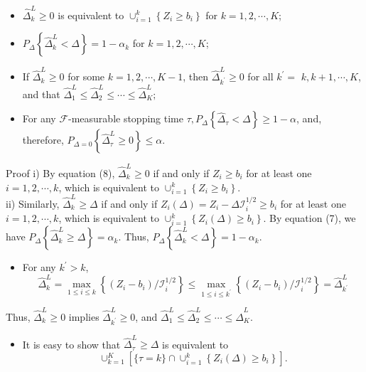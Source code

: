 \documentclass[10pt]{article}
\begin{document}
\begin{itemize}
  \item[i)] $\hat{\Delta}_{k}^{L} \geq 0$ is equivalent to $\cup_{i=1}^{k}\left\{Z_{i} \geq b_{i}\right\}$ for $k=1,2, \cdots, K$;
  \item[ii)] $P_{\Delta}\left\{\hat{\Delta}_{k}^{L}<\Delta\right\}=1-\alpha_{k}$ for $k=1,2, \cdots, K$;
  \item[iii)] If $\hat{\Delta}_{k}^{L} \geq 0$ for some $k=1,2, \cdots, K-1$, then $\hat{\Delta}_{k^{\prime}}^{L} \geq 0$ for all $k^{\prime}=$ $k, k+1, \cdots, K$, and that $\hat{\Delta}_{1}^{L} \leq \hat{\Delta}_{2}^{L} \leq \cdots \leq \hat{\Delta}_{K}^{L} ;$
  \item[iv)] For any $\mathcal{F}$-measurable stopping time $\tau, P_{\Delta}\left\{\hat{\Delta}_{\tau}<\Delta\right\} \geq 1-\alpha$, and, therefore, $P_{\Delta=0}\left\{\hat{\Delta}_{\tau}^{L} \geq 0\right\} \leq \alpha$.
\end{itemize}

Proof i) By equation (8), $\hat{\Delta}_{k}^{L} \geq 0$ if and only if $Z_{i} \geq b_{i}$ for at least one $i=1,2, \cdots, k$, which is equivalent to $\cup_{i=1}^{k}\left\{Z_{i} \geq b_{i}\right\}$.\\
ii) Similarly, $\hat{\Delta}_{k}^{L} \geq \Delta$ if and only if $Z_{i}(\Delta)=Z_{i}-\Delta \mathcal{I}_{i}^{1 / 2} \geq b_{i}$ for at least one $i=1,2, \cdots, k$, which is equivalent to $\cup_{i=1}^{k}\left\{Z_{i}(\Delta) \geq b_{i}\right\}$. By equation (7), we have $P_{\Delta}\left\{\hat{\Delta}_{k}^{L} \geq \Delta\right\}=\alpha_{k}$. Thus, $P_{\Delta}\left\{\hat{\Delta}_{k}^{L}<\Delta\right\}=1-\alpha_{k}$.

\begin{itemize}
  \item[iii)] For any $k^{\prime}>k$,
$$
\hat{\Delta}_{k}^{L}=\max _{1 \leq i \leq k}\left\{\left(Z_{i}-b_{i}\right) / \mathcal{I}_{i}^{1 / 2}\right\} \leq \max _{1 \leq i \leq k^{\prime}}\left\{\left(Z_{i}-b_{i}\right) / \mathcal{I}_{i}^{1 / 2}\right\}=\hat{\Delta}_{k^{\prime}}^{L}
$$
\end{itemize}

Thus, $\hat{\Delta}_{k}^{L} \geq 0$ implies $\hat{\Delta}_{k^{\prime}}^{L} \geq 0$, and $\hat{\Delta}_{1}^{L} \leq \hat{\Delta}_{2}^{L} \leq \cdots \leq \hat{\Delta}_{K}^{L}$.

\begin{itemize}
  \item[iv)] It is easy to show that $\hat{\Delta}_{\tau}^{L} \geq \Delta$ is equivalent to
$$
\cup_{k=1}^{K}\left[\{\tau=k\} \cap \cup_{i=1}^{k}\left\{Z_{i}(\Delta) \geq b_{i}\right\}\right] .
$$
\end{itemize}
\end{document}
